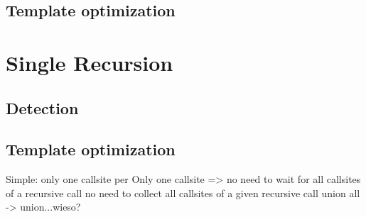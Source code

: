 \subsection{Template optimization}

\section{Single Recursion}
\subsection{Detection}
\subsection{Template optimization}
Simple: only one callsite per 
Only one callsite => no need to wait for all callsites of a recursive call
no need to collect all callsites of a given recursive call
union all -> union...wieso?